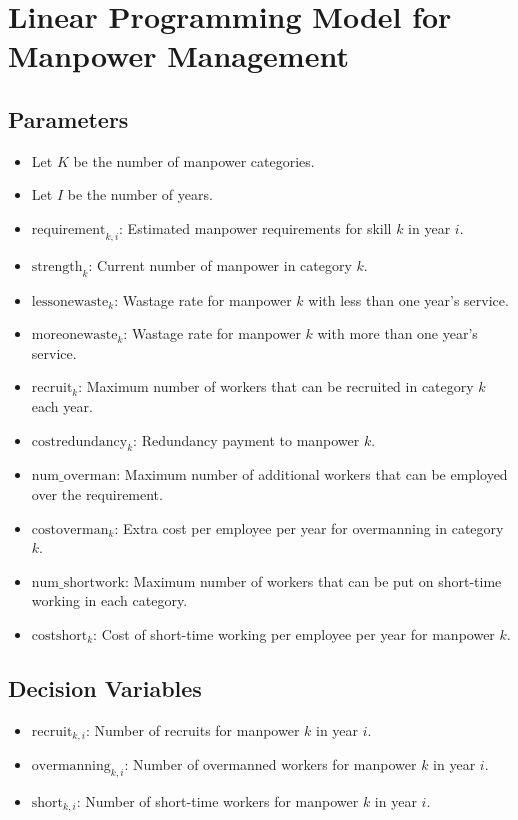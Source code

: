 \documentclass{article}
\begin{document}
\section*{Linear Programming Model for Manpower Management}

\subsection*{Parameters}
\begin{itemize}
    \item Let \( K \) be the number of manpower categories.
    \item Let \( I \) be the number of years.
    \item \( \text{requirement}_{k, i} \): Estimated manpower requirements for skill \( k \) in year \( i \).
    \item \( \text{strength}_{k} \): Current number of manpower in category \( k \).
    \item \( \text{lessonewaste}_{k} \): Wastage rate for manpower \( k \) with less than one year's service.
    \item \( \text{moreonewaste}_{k} \): Wastage rate for manpower \( k \) with more than one year's service.
    \item \( \text{recruit}_{k} \): Maximum number of workers that can be recruited in category \( k \) each year.
    \item \( \text{costredundancy}_{k} \): Redundancy payment to manpower \( k \).
    \item \( \text{num\_overman} \): Maximum number of additional workers that can be employed over the requirement.
    \item \( \text{costoverman}_{k} \): Extra cost per employee per year for overmanning in category \( k \).
    \item \( \text{num\_shortwork} \): Maximum number of workers that can be put on short-time working in each category.
    \item \( \text{costshort}_{k} \): Cost of short-time working per employee per year for manpower \( k \).
\end{itemize}

\subsection*{Decision Variables}
\begin{itemize}
    \item \( \text{recruit}_{k, i} \): Number of recruits for manpower \( k \) in year \( i \).
    \item \( \text{overmanning}_{k, i} \): Number of overmanned workers for manpower \( k \) in year \( i \).
    \item \( \text{short}_{k, i} \): Number of short-time workers for manpower \( k \) in year \( i \).
\end{itemize}
\end{document}
